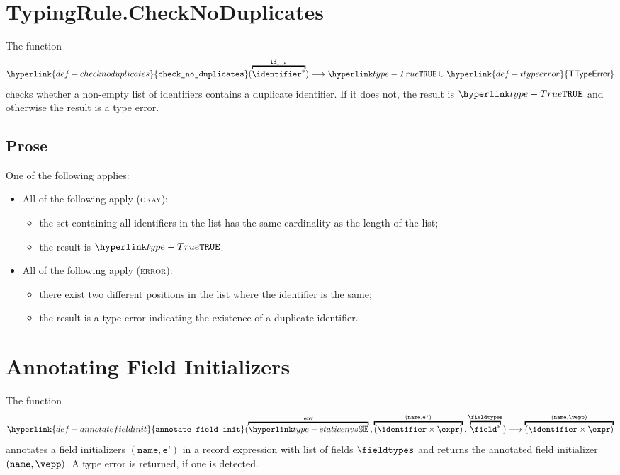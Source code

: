 \documentclass{book}
\newcommand\TypeError[0]{\hyperlink{def-typeerror}{\textsf{TypeError}}}
\newcommand\TypeErrorVal[1]{\TypeError(\texttt{"ERROR[#1]"})}
\newcommand\TTypeError[0]{\hyperlink{def-ttypeerror}{\textsf{TTypeError}}}
\newcommand\annotaterel[0]{\hyperlink{def-annotaterel}{\textsf{type}}}
\newcommand\typearrow[0]{\xrightarrow{\annotaterel}}
\newcommand\annotatefieldinit[0]{\hyperlink{def-annotatefieldinit}{\texttt{annotate\_field\_init}}}
\newcommand\checknoduplicates[0]{\hyperlink{def-checknoduplicates}{\texttt{check\_no\_duplicates}}}
\newcommand\vep[0]{\texttt{e'}}
\newcommand\name[0]{\texttt{name}}
\begin{document}
\hypertarget{def-checknoduplicates}{}
\section{TypingRule.CheckNoDuplicates \label{sec:TypingRule.CheckNoDuplicates}}
The function
\[
  \checknoduplicates(\overname{\identifier^*}{\id_{1..k}}) \aslto \True \cup \TTypeError
\]
checks whether a non-empty list of identifiers contains a duplicate identifier. If it does not, the result
is $\True$ and otherwise the result is a type error.

\subsection{Prose}
One of the following applies:
\begin{itemize}
  \item All of the following apply (\textsc{okay}):
  \begin{itemize}
    \item the set containing all identifiers in the list has the same cardinality as the length of the list;
    \item the result is $\True$.
  \end{itemize}

  \item All of the following apply (\textsc{error}):
  \begin{itemize}
    \item there exist two different positions in the list where the identifier is the same;
    \item the result is a type error indicating the existence of a duplicate identifier.
  \end{itemize}
\end{itemize}

\begin{emptyformal}
\end{emptyformal}

\hypertarget{def-annotatefieldinit}{}
\section{Annotating Field Initializers}
The function
\[
  \annotatefieldinit(
    \overname{\staticenvs}{\tenv} \aslsep
    \overname{(\identifier\times\expr)}{(\name, \vep)} \aslsep
    \overname{\field^*}{\fieldtypes}
  ) \aslto
  \overname{(\identifier\times\expr)}{(\name, \vepp)}
\]
annotates a field initializers $(\name, \vep)$ in a record expression
with list of fields $\fieldtypes$ and returns the annotated field initializer
$(\name, \vepp)$. A type error is returned, if one is detected.
\end{document}
